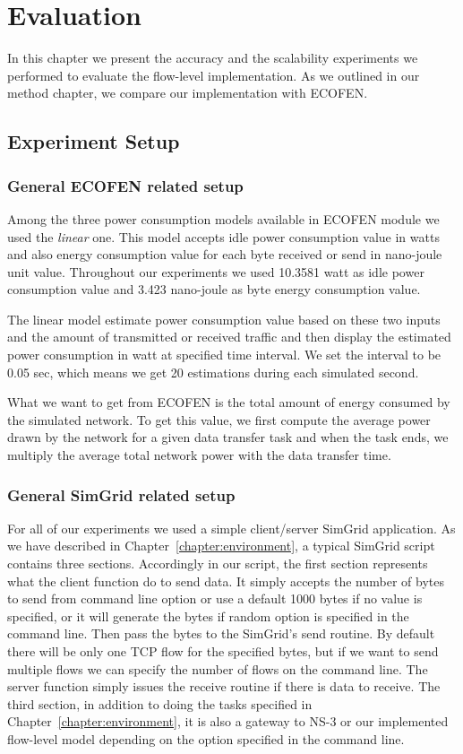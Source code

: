 \chapter{Evaluation}
\label{chapter:evaluation}
In this chapter we present the accuracy and the scalability experiments we performed to evaluate the flow-level implementation. As we outlined in our method chapter, we compare our implementation with ECOFEN.  
\section{Experiment Setup}

\subsection{General ECOFEN related setup}
Among the three power consumption models available in ECOFEN module we used the \emph{linear} one. This model accepts idle power consumption value in watts and also energy consumption value for each byte received or send in nano-joule unit value. Throughout our experiments we used 10.3581 watt as idle power consumption value and 3.423 nano-joule as byte energy consumption value. 

The linear model estimate power consumption value based on these two inputs and the amount of transmitted or received traffic and then display the estimated power consumption in watt at specified time interval. We set the interval to be 0.05 sec, which means we get 20 estimations during each simulated second. 

What we want to get from ECOFEN is the total amount of energy consumed by the simulated network. To get this value, we first compute the average power drawn by the network for a given data transfer task and when the task ends, we multiply the average total network power with the data transfer time. 

\subsection{General SimGrid related setup}
For all of our experiments we used a simple client/server SimGrid application. As we have described in Chapter~\ref{chapter:environment}, a typical SimGrid script contains three sections. Accordingly in our script, the first section represents what the client function do to send data. It simply accepts the number of bytes to send from command line option or use a default 1000 bytes if no value is specified, or it will generate the bytes if random option is specified in the command line. Then pass the bytes to the SimGrid's send routine. By default there will be only one TCP flow for the specified bytes, but if we want to send multiple flows we can specify the number of flows on the command line. The server function simply issues the receive routine if there is data to receive. The third section, in addition to doing the tasks specified in Chapter~\ref{chapter:environment},  it is also a gateway to NS-3 or our implemented flow-level model depending on the option specified in the command line. 


